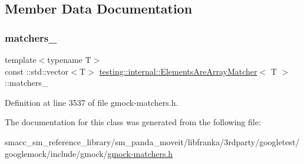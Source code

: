 \subsection{Member Data Documentation}
\mbox{\label{classtesting_1_1internal_1_1ElementsAreArrayMatcher_af28db07928ad4eb3128d553757ed712c}} 
\subsubsection{\texorpdfstring{matchers\+\_\+}{matchers\_}}
{\footnotesize\ttfamily template$<$typename T$>$ \\
const \+::std\+::vector$<$T$>$ \hyperlink{classtesting_1_1internal_1_1ElementsAreArrayMatcher}{testing\+::internal\+::\+Elements\+Are\+Array\+Matcher}$<$ T $>$\+::matchers\+\_\+\hspace{0.3cm}{\ttfamily [private]}}



Definition at line 3537 of file gmock-\/matchers.\+h.



The documentation for this class was generated from the following file\+:\begin{DoxyCompactItemize}
\item 
smacc\+\_\+sm\+\_\+reference\+\_\+library/sm\+\_\+panda\+\_\+moveit/libfranka/3rdparty/googletest/googlemock/include/gmock/\hyperlink{gmock-matchers_8h}{gmock-\/matchers.\+h}\end{DoxyCompactItemize}
